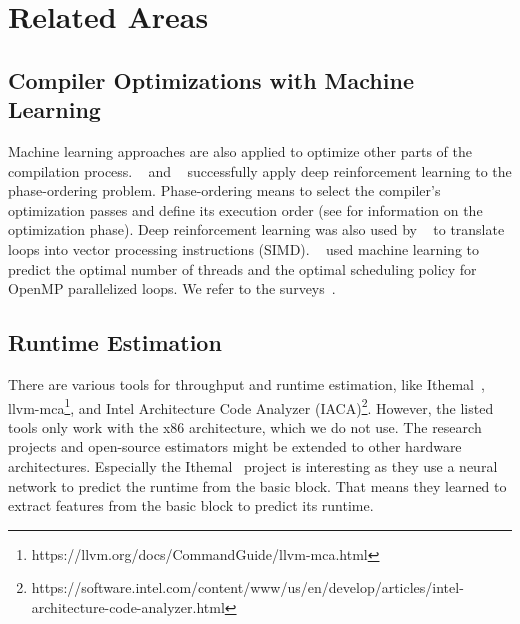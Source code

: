 \section{Related Areas}
\label{sec:rw:other}
\subsection{Compiler Optimizations with Machine Learning}
Machine learning approaches are also applied to optimize other parts of the compilation process.
\citeauthor{mammadli2020static}~\cite{mammadli2020static} and \citeauthor{huang2019autophase}~\cite{huang2019autophase} successfully apply deep reinforcement learning to the phase-ordering problem.
Phase-ordering means to select the compiler's optimization passes and define its execution order (see  for information on the optimization phase).
Deep reinforcement learning was also used by \citeauthor{haj2020neurovectorizer}~\cite{haj2020neurovectorizer} to translate loops into vector processing instructions (SIMD).
\citeauthor{wang2009mapping}~\cite{wang2009mapping} used machine learning to predict the optimal number of threads and the optimal scheduling policy for OpenMP parallelized loops.
We refer to the surveys~\cite{wang2018machine,ashouri2018survey}.

\subsection{Runtime Estimation}
\label{sec:rw:other:runtime}
There are various tools for throughput and runtime estimation, like Ithemal~\cite{mendis2019ithemal}, llvm-mca\footnote{https://llvm.org/docs/CommandGuide/llvm-mca.html}, and Intel Architecture Code Analyzer (IACA)\footnote{https://software.intel.com/content/www/us/en/develop/articles/intel-architecture-code-analyzer.html}.
However, the listed tools only work with the x86 architecture, which we do not use.
The research projects and open-source estimators might be extended to other hardware architectures.
Especially the Ithemal~\cite{mendis2019ithemal} project is interesting as they use a neural network to predict the runtime from the basic block.
That means they learned to extract features from the basic block to predict its runtime.

